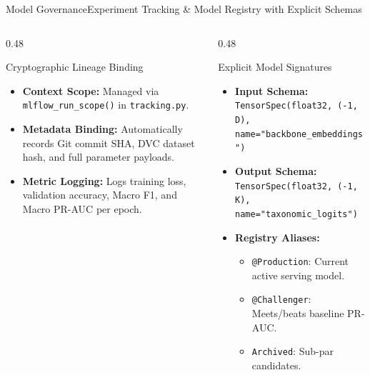 \begin{frame}{Model Governance}{Experiment Tracking \& Model Registry with Explicit Schemas}
    \begin{columns}[T]
        \begin{column}{0.48\textwidth}
            \begin{block}{Cryptographic Lineage Binding}
                \begin{itemize}\footnotesize
                    \item \textbf{Context Scope:} Managed via \texttt{mlflow\_run\_scope()} in \texttt{tracking.py}.
                    \item \textbf{Metadata Binding:} Automatically records Git commit SHA, DVC dataset hash, and full parameter payloads.
                    \item \textbf{Metric Logging:} Logs training loss, validation accuracy, Macro F1, and Macro PR-AUC per epoch.
                \end{itemize}
            \end{block}
        \end{column}
        \begin{column}{0.48\textwidth}
            \begin{block}{Explicit Model Signatures}
                \begin{itemize}\footnotesize
                    \item \textbf{Input Schema:}
                        \texttt{TensorSpec(float32, (-1, D), name="backbone\_embeddings")}
                    \item \textbf{Output Schema:}
                        \texttt{TensorSpec(float32, (-1, K), name="taxonomic\_logits")}
                    \item \textbf{Registry Aliases:}
                        \begin{itemize}\scriptsize
                            \item \texttt{@Production}: Current active serving model.
                            \item \texttt{@Challenger}: Meets/beats baseline PR-AUC.
                            \item \texttt{Archived}: Sub-par candidates.
                        \end{itemize}
                \end{itemize}
            \end{block}
        \end{column}
    \end{columns}


\end{frame}
